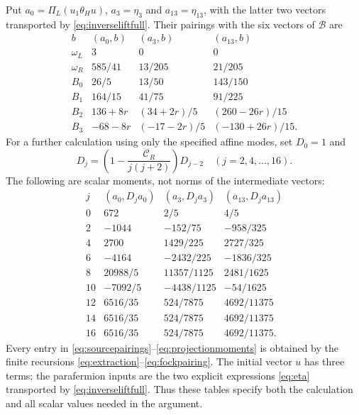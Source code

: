 \documentclass[11pt,reqno]{amsart}
\theoremstyle{definition}\newtheorem{definition}[theorem]{Definition}
\theoremstyle{remark}\newtheorem{remark}[theorem]{Remark}
\numberwithin{equation}{section}
\begin{document}
Put $a_0=\Pi_L(u_1\theta_Hu)$, $a_3=\eta_3$ and $a_{13}=\eta_{13}$, with the latter two vectors transported by \eqref{eq:inverseliftfull}. Their pairings with the six vectors of $\mathcal B$ are
\begin{equation}\label{eq:sourcepairings}
\begin{array}{c|ccc}
 b&(a_0,b)&(a_3,b)&(a_{13},b)\\\hline
 \omega_L&3&0&0\\
 \omega_R&585/41&13/205&21/205\\
 B_0&26/5&13/50&143/150\\
 B_1&164/15&41/75&91/225\\
 B_2&136+8r&(34+2r)/5&(260-26r)/15\\
 B_3&-68-8r&(-17-2r)/5&(-130+26r)/15.
\end{array}
\end{equation}
For a further calculation using only the specified affine modes, set $D_0=1$ and
\[
 D_j=\left(1-\frac{\mathcal C_R}{j(j+2)}\right)D_{j-2}
 \quad(j=2,4,\ldots,16).
\]
The following are scalar moments, not norms of the intermediate vectors:
\begin{equation}\label{eq:projectionmoments}
\begin{array}{c|rrr}
 j&(a_0,D_ja_0)&(a_3,D_ja_3)&(a_{13},D_ja_{13})\\\hline
 0&672&2/5&4/5\\
 2&-1044&-152/75&-958/325\\
 4&2700&1429/225&2727/325\\
 6&-4164&-2432/225&-1836/325\\
 8&20988/5&11357/1125&2481/1625\\
 10&-7092/5&-4438/1125&-54/1625\\
 12&6516/35&524/7875&4692/11375\\
 14&6516/35&524/7875&4692/11375\\
 16&6516/35&524/7875&4692/11375.
\end{array}
\end{equation}
Every entry in \eqref{eq:sourcepairings}--\eqref{eq:projectionmoments} is obtained by the finite recursions \eqref{eq:extraction}--\eqref{eq:fockpairing}. The initial vector $u$ has three terms; the parafermion inputs are the two explicit expressions \eqref{eq:eta} transported by \eqref{eq:inverseliftfull}. Thus these tables specify both the calculation and all scalar values needed in the argument.
\end{document}
